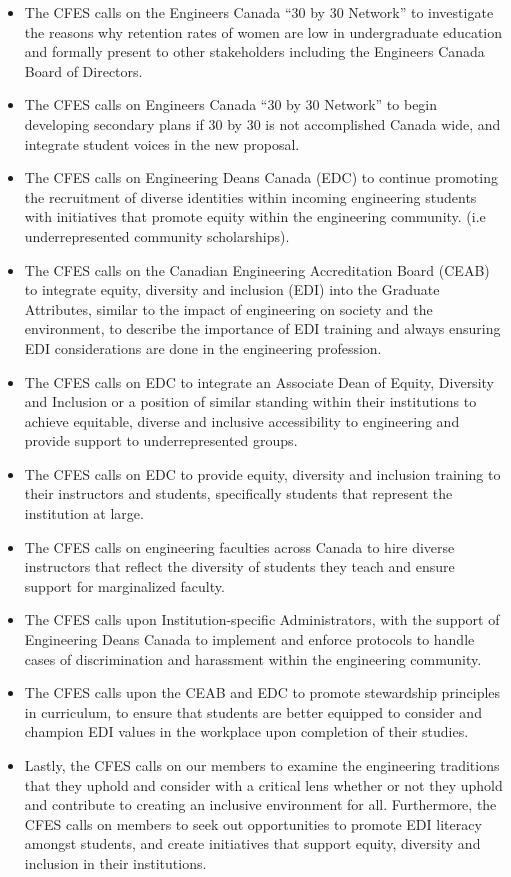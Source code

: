 \begin{itemize}
 \item The CFES calls on the Engineers Canada ``30 by 30 Network'' to investigate the reasons why retention rates of women are low in undergraduate education and formally present to other stakeholders including the Engineers Canada Board of Directors.
 \item The CFES calls on Engineers Canada ``30 by 30 Network'' to begin developing secondary plans if 30 by 30 is not accomplished Canada wide, and integrate student voices in the new proposal.
 \item The CFES calls on Engineering Deans Canada (EDC) to continue promoting the recruitment of diverse identities within incoming engineering students with initiatives that promote equity within the engineering community. (i.e underrepresented community scholarships).
 \item The CFES calls on the Canadian Engineering Accreditation Board (CEAB) to integrate equity, diversity and inclusion (EDI) into the Graduate Attributes, similar to the impact of engineering on society and the environment, to describe the importance of EDI training and always ensuring EDI considerations are done in the engineering profession.
 \item The CFES calls on EDC to integrate an Associate Dean of Equity, Diversity and Inclusion or a position of similar standing within their institutions to achieve equitable, diverse and inclusive accessibility to engineering and provide support to underrepresented groups.
 \item The CFES calls on EDC to provide equity, diversity and inclusion training to their instructors and students, specifically students that represent the institution at large.
 \item The CFES calls on engineering faculties across Canada to hire diverse instructors that reflect the diversity of students they teach and ensure support for marginalized faculty.
 \item The CFES calls upon Institution-specific Administrators, with the support of Engineering Deans Canada to implement and enforce protocols to handle cases of discrimination and harassment within the engineering community.
 \item The CFES calls upon the CEAB and EDC to promote stewardship principles in curriculum, to ensure that students are better equipped to consider and champion EDI values in the workplace upon completion of their studies.
 \item Lastly, the CFES calls on our members to examine the engineering traditions that they uphold and consider with a critical lens whether or not they uphold and contribute to creating an inclusive environment for all. Furthermore, the CFES calls on members to seek out opportunities to promote EDI literacy amongst students, and create initiatives that support equity, diversity and inclusion in their institutions.
\end{itemize}

